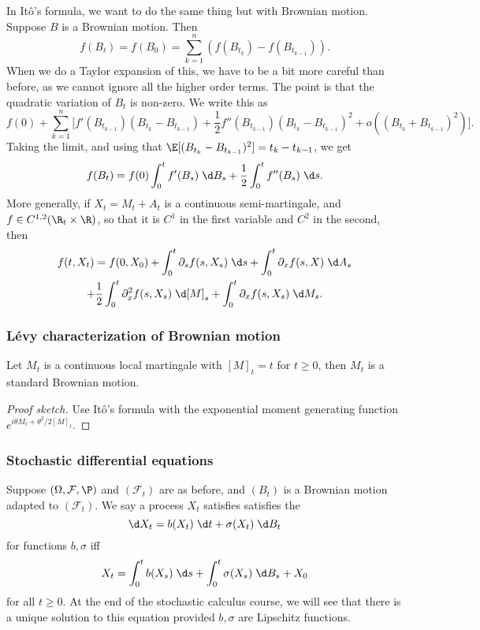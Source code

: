 \documentclass[a4paper]{article}
\begin{document}
In It\^o's formula, we want to do the same thing but with Brownian motion. Suppose $B$ is a Brownian motion. Then
\[
  f(B_t) = f(B_0) = \sum_{k = 1}^n (f(B_{t_k}) - f(B_{t_{k - 1}})).
\]
When we do a Taylor expansion of this, we have to be a bit more careful than before, as we cannot ignore all the higher order terms. The point is that the quadratic variation of $B_t$ is non-zero. We write this as
\[
  f(0) + \sum_{k = 1}^n \Big[f'(B_{t_{k\!-\!1}}) (B_{t_k} - B_{t_{k\!-\!1}}) + \frac{1}{2} f''(B_{t_{k\!-\!1}}) (B_{t_k} - B_{t_{k\!-\!1}})^2 + o((B_{t_k} + B_{t_{k\!-\!1}})^2)\Big].
\]
Taking the limit, and using that $\E[(B_{t_k} - B_{t_{k - 1}})^2] = t_k - t_{k - 1}$, we get
\[
  f(B_t) = f(0) \int_0^t f'(B_s)\;\d B_s + \frac{1}{2} \int_0^t f''(B_s) \;\d s.
\]
More generally, if $X_t = M_t + A_t$ is a continuous semi-martingale, and $f \in C^{1, 2}(\R_t \times \R)$, so that it is $C^1$ in the first variable and $C^2$ in the second, then
\begin{multline*}
  f(t, X_t) = f(0, X_0) + \int_0^t \partial_s f(s, X_s) \;\d s + \int_0^t \partial_x f(s, X)\;\d A_s\\
  + \frac{1}{2} \int_0^t \partial_x^2 f(s, X_s) \;\d [M]_s + \int_0^t \partial_x f(s, X_s) \;\d M_s.
\end{multline*}

\subsubsection*{L\'evy characterization of Brownian motion}
\begin{thm}
  Let $M_t$ is a continuous local martingale with $[M]_t = t$ for $t \geq 0$, then $M_t$ is a standard Brownian motion.
\end{thm}

\begin{proof}[Proof sketch]
  Use It\^o's formula with the exponential moment generating function $e^{i\theta M_t + \theta^2/2 [M]_t}$.
\end{proof}

\subsubsection*{Stochastic differential equations}
Suppose $(\Omega, \mathcal{F}, \P)$ and $(\mathcal{F}_t)$ are as before, and $(B_t)$ is a Brownian motion adapted to $(\mathcal{F}_t)$. We say a process $X_t$ satisfies satisfies the 
\[
  \d X_t = b(X_t) \;\d t + \sigma(X_t) \;\d B_t
\]
for functions $b, \sigma$ iff
\[
  X_t = \int_0^t b(X_s) \;\d s + \int_0^t \sigma(X_s) \;\d B_s + X_0
\]
for all $t \geq 0$. At the end of the stochastic calculus course, we will see that there is a unique solution to this equation provided $b, \sigma$ are Lipschitz functions.
\end{document}
